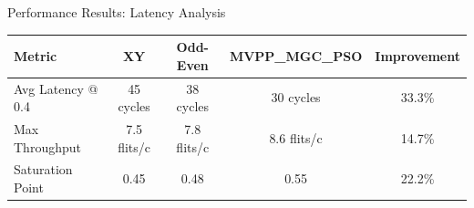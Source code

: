 \documentclass[10pt,aspectratio=169]{beamer}
\begin{document}
\begin{frame}{Performance Results: Latency Analysis}
\begin{figure}
    \end{figure}
    
    \begin{table}[h]
        \centering
        \small
        \begin{tabular}{|l|c|c|c|c|}
            \hline
            \textbf{Metric} & \textbf{XY} & \textbf{Odd-Even} & \textbf{MVPP\_MGC\_PSO} & \textbf{Improvement} \\
            \hline
            Avg Latency @ 0.4 & 45 cycles & 38 cycles & 30 cycles & 33.3\% \\
            Max Throughput & 7.5 flits/c & 7.8 flits/c & 8.6 flits/c & 14.7\% \\
            Saturation Point & 0.45 & 0.48 & 0.55 & 22.2\% \\
            \hline
        \end{tabular}
    \end{table}
\end{frame}
\end{document}
